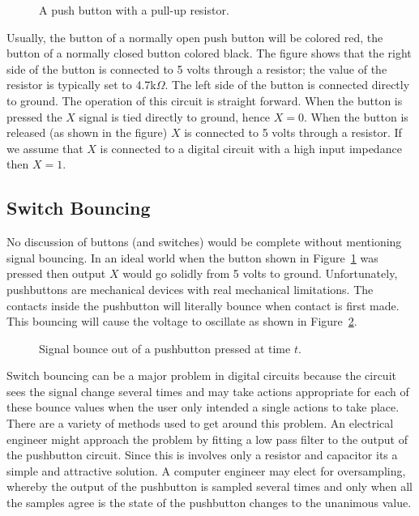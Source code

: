     \begin{figure}[ht]
        \caption{A push button with a pull-up resistor.}
        \label{fig:commonPeripheralComponentspushbutton}
    \end{figure}

    Usually, the button of a normally open push button will be colored
    red, the button of a normally closed button colored black.
    The figure shows that the right side of the button is connected to
    5 volts through a resistor; the value of the resistor is typically
    set to 4.7k$\Omega$.  The left side of the button is connected directly
    to ground.  The operation of this circuit is straight forward.  When
    the button is pressed the $X$ signal is tied directly to ground,
    hence $X=0$.  When the button is released (as shown in the figure)
    $X$ is connected to 5 volts through a resistor.  If we assume that
    $X$ is connected to a digital circuit with a high input impedance
    then $X=1$.

    \subsection{Switch Bouncing}
    No discussion of buttons (and switches) would be complete without
    mentioning signal bouncing.  In an ideal world when the button
        shown in Figure~\ref{fig:commonPeripheralComponentspushbutton} was pressed then output $X$
        would go solidly from 5 volts to ground.  Unfortunately, pushbuttons
        are mechanical devices with real mechanical limitations.  The contacts
        inside the pushbutton will literally bounce when contact is first
        made.  This bouncing will cause the voltage to oscillate as shown
        in Figure~\ref{fig:commonPeripheralComponentsbounce}.

        \begin{figure}[ht]
            \caption{Signal bounce out of a pushbutton pressed at time $t$.}
            \label{fig:commonPeripheralComponentsbounce}
        \end{figure}

        Switch bouncing can be a major problem in digital circuits because
        the circuit sees the signal change several times and may take
        actions appropriate for each of these bounce values when the user
        only intended a single actions to take place.  There are a variety of
        methods used to get around this problem.  An electrical engineer
        might approach the problem by fitting a low pass filter to the
        output of the pushbutton circuit.  Since this is involves only a
        resistor and capacitor its a simple and attractive solution.  A
        computer engineer may elect for oversampling, whereby the output
        of the pushbutton is sampled several times and only when all the
        samples agree is the state of the pushbutton changes to the
        unanimous value.

